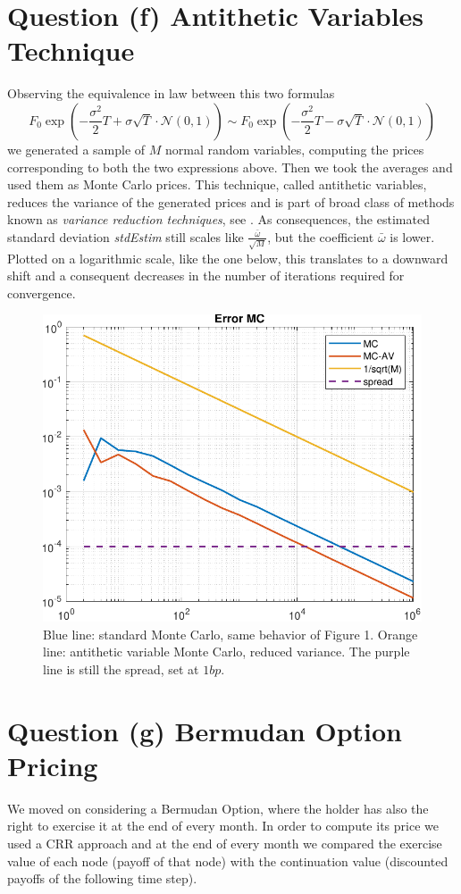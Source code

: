 \vspace{1 cm}
\section{Question (f) Antithetic Variables Technique}
Observing the equivalence in law between this two formulas
\begin{equation*}
 F_0 \exp\left(-\frac{\sigma^2}{2} T + \sigma \sqrt{T} \cdot \mathcal{N}(0,1) \right) \sim
F_0 \exp\left(-\frac{\sigma^2}{2} T - \sigma \sqrt{T} \cdot \mathcal{N}(0,1) \right)
\end{equation*}
we generated a sample of $M$ normal random variables, computing the prices corresponding to both the two expressions above. Then we took the averages and used them as Monte Carlo prices.
This technique, called antithetic variables, reduces the variance of the generated prices and is part of broad class of methods known as \textit{variance reduction techniques}, see \cite{Hull}. As consequences, the estimated standard deviation \textit{stdEstim} still scales like $\frac{\bar{\omega}}{\sqrt{M}}$, but the coefficient $\bar{\omega}$ is lower. Plotted on a logarithmic scale, like the one below, this translates to a downward shift and a consequent decreases in the number of iterations required for convergence.

\begin{figure}[H]
    \centering
    \includegraphics[width=0.7\linewidth]{imgs/antithetic_vars.pdf}
    \caption{Blue line: standard Monte Carlo, same behavior of Figure 1. Orange line: antithetic variable Monte Carlo, reduced variance. The purple line is still the spread, set at $1bp$.}
    \label{fig:antithetic-var}
\end{figure}

\section{Question (g) Bermudan Option Pricing}
We moved on considering a Bermudan Option, where the holder has also the right to exercise it at the end of every month. In order to compute its price we used a CRR approach and at the end of every month we compared the exercise value of each node (payoff of that node) with the continuation value (discounted payoffs of the following time step).

